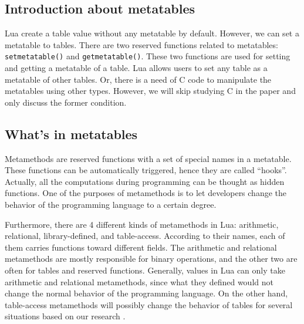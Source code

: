 \subsection{Introduction about metatables}
Lua create a table value without any metatable by default.
However, we can set a metatable to tables.
There are two reserved functions related to metatables: {\tt setmetatable()} and {\tt getmetatable()}. These two functions are used for setting and getting a metatable of a table. %
Lua allows users to set any table as a metatable of other tables. Or, there is a need of C code to manipulate the metatables using other types. However, we will skip studying C in the paper and only discuss the former condition.

\subsection{What's in metatables}
Metamethods are reserved functions with a set of special names in a metatable. These functions can be automatically triggered, hence they are called ``hooks''. Actually, all the computations during programming can be thought as hidden functions. One of the purposes of metamethods is to let developers change the behavior of the programming language to a certain degree.

Furthermore, there are 4 different kinds of metamethods in Lua: arithmetic, relational, library-defined, and table-access. According to their names, each of them carries functions toward different fields. The arithmetic and relational metamethods are mostly responsible for binary operations, and the other two are often for tables and reserved functions. Generally, values in Lua can only take arithmetic and relational metamethods, since what they defined would not change the normal behavior of the programming language. On the other hand, table-access metamethods will possibly change the behavior of tables for several situations based on our research \cite{PIL}.

